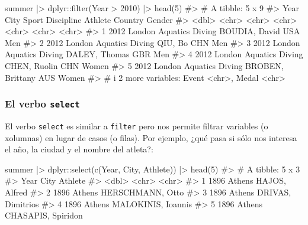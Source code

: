 \documentclass[
  letterpaper,
  DIV=11,
  numbers=noendperiod,
  oneside]{scrreprt}
\newenvironment{Shaded}{\begin{snugshade}}{\end{snugshade}}
\newcommand{\CommentTok}[1]{\textcolor[rgb]{0.37,0.37,0.37}{#1}}
\newcommand{\DecValTok}[1]{\textcolor[rgb]{0.68,0.00,0.00}{#1}}
\newcommand{\FunctionTok}[1]{\textcolor[rgb]{0.28,0.35,0.67}{#1}}
\newcommand{\NormalTok}[1]{\textcolor[rgb]{0.00,0.23,0.31}{#1}}
\newcommand{\SpecialCharTok}[1]{\textcolor[rgb]{0.37,0.37,0.37}{#1}}
\begin{document}
\begin{Shaded}
\begin{Highlighting}[]
\NormalTok{summer }\SpecialCharTok{|\textgreater{}}\NormalTok{ dplyr}\SpecialCharTok{::}\FunctionTok{filter}\NormalTok{(Year }\SpecialCharTok{\textgreater{}} \DecValTok{2010}\NormalTok{) }\SpecialCharTok{|\textgreater{}} \FunctionTok{head}\NormalTok{(}\DecValTok{5}\NormalTok{)}
\CommentTok{\#\textgreater{} \# A tibble: 5 x 9}
\CommentTok{\#\textgreater{}    Year City   Sport    Discipline Athlete          Country Gender}
\CommentTok{\#\textgreater{}   \textless{}dbl\textgreater{} \textless{}chr\textgreater{}  \textless{}chr\textgreater{}    \textless{}chr\textgreater{}      \textless{}chr\textgreater{}            \textless{}chr\textgreater{}   \textless{}chr\textgreater{} }
\CommentTok{\#\textgreater{} 1  2012 London Aquatics Diving     BOUDIA, David    USA     Men   }
\CommentTok{\#\textgreater{} 2  2012 London Aquatics Diving     QIU, Bo          CHN     Men   }
\CommentTok{\#\textgreater{} 3  2012 London Aquatics Diving     DALEY, Thomas    GBR     Men   }
\CommentTok{\#\textgreater{} 4  2012 London Aquatics Diving     CHEN, Ruolin     CHN     Women }
\CommentTok{\#\textgreater{} 5  2012 London Aquatics Diving     BROBEN, Brittany AUS     Women }
\CommentTok{\#\textgreater{} \# i 2 more variables: Event \textless{}chr\textgreater{}, Medal \textless{}chr\textgreater{}}
\end{Highlighting}
\end{Shaded}

\hypertarget{el-verbo-select}{%
\subsubsection{\texorpdfstring{El verbo
\texttt{select}}{El verbo select}}\label{el-verbo-select}}

El verbo \texttt{select} es similar a \texttt{filter} pero nos permite
filtrar variables (o xolumnas) en lugar de casos (o filas). Por ejemplo,
¿qué pasa si sólo nos interesa el año, la ciudad y el nombre del
atleta?:

\begin{Shaded}
\begin{Highlighting}[]
\NormalTok{summer }\SpecialCharTok{|\textgreater{}}\NormalTok{ dplyr}\SpecialCharTok{::}\FunctionTok{select}\NormalTok{(}\FunctionTok{c}\NormalTok{(Year, City, Athlete)) }\SpecialCharTok{|\textgreater{}} \FunctionTok{head}\NormalTok{(}\DecValTok{5}\NormalTok{)}
\CommentTok{\#\textgreater{} \# A tibble: 5 x 3}
\CommentTok{\#\textgreater{}    Year City   Athlete           }
\CommentTok{\#\textgreater{}   \textless{}dbl\textgreater{} \textless{}chr\textgreater{}  \textless{}chr\textgreater{}             }
\CommentTok{\#\textgreater{} 1  1896 Athens HAJOS, Alfred     }
\CommentTok{\#\textgreater{} 2  1896 Athens HERSCHMANN, Otto  }
\CommentTok{\#\textgreater{} 3  1896 Athens DRIVAS, Dimitrios }
\CommentTok{\#\textgreater{} 4  1896 Athens MALOKINIS, Ioannis}
\CommentTok{\#\textgreater{} 5  1896 Athens CHASAPIS, Spiridon}
\end{Highlighting}
\end{Shaded}
\end{document}
